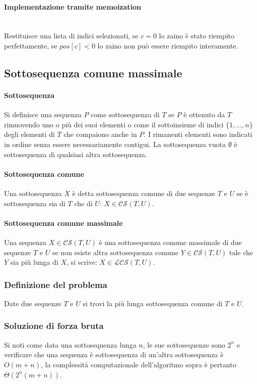 \paragraph{Implementazione tramite memoization}\mbox{}\\

Restituisce una lista di indici selezionati, se $c=0$ lo zaino \`e stato riempito perfettamente, se $pos[c]<0$ lo zaino non pu\`o essere riempito 
interamente.
\subsection{Sottosequenza comune massimale}
\paragraph{Sottosequenza}
Si definisce una sequenza $P$ come sottosequenza di $T$ se $P$ \`e ottenuto da $T$ rimuovendo uno o pi\`u dei suoi elementi o come il sottoinsieme di indici
$\{1, \dots, n\}$ degli elementi di $T$ che compaiono anche in $P$. I rimanenti elementi sono indicati in ordine senza essere necessariamente contigui. La
sottosequenza vuota $\emptyset$ \`e sottosequenza di qualsiasi altra sottosequenza. 
\paragraph{Sottosequenza comune}
Una sottosequenza $X$ \`e detta sottosequenza comune di due sequenze $T$ e $U$ se \`e sottosequenza sia di $T$ che di $U$: $X\in \mathcal{CS}(T, U)$.
\paragraph{Sottosequenza comune massimale}
Una sequenza $X\in \mathcal{CS}(T, U)$ \`e una sottosequenza comune massimale di due sequenze $T$ e $U$ se non esiste altra sottosequenza comune $Y\in 
\mathcal{CS}(T, U)$ tale che $Y$ sia pi\`u lunga di $X$, si scrive: $X\in \mathcal{LCS}(T, U)$.
\subsubsection{Definizione del problema}
Date due sequenze $T$ e $U$ si trovi la pi\`u lunga sottosequenza comune di $T$ e $U$. 
\subsubsection{Soluzione di forza bruta}

Si noti come data una sottosequenza lunga $n$, le sue sottosequenze sono $2^n$ e verificare che una sequenza \`e sottosequenza di un'altra sottosequenza
\`e $O(m+n)$, la complessit\`a computazionale dell'algoritmo sopra \`e pertanto $\Theta(2^n(m+n))$. 
